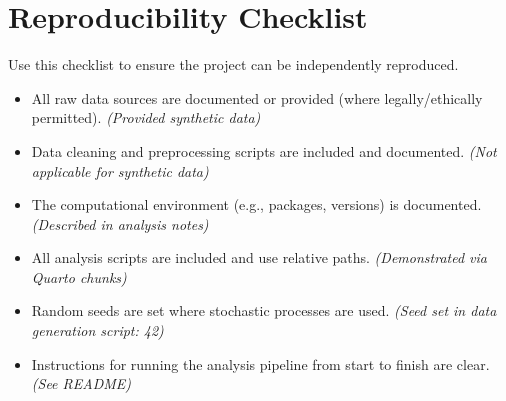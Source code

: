 \documentclass[
]{report}
\author{}
\date{}
\providecommand{\tightlist}{%
  \setlength{\itemsep}{0pt}\setlength{\parskip}{0pt}}
\renewcommand*\contentsname{Table of contents}
\newcommand\contentsname{Table of contents}
\begin{document}
\renewcommand*\contentsname{Table of contents}
{
\hypersetup{linkcolor=}
\setcounter{tocdepth}{2}
\tableofcontents
}

\chapter{Reproducibility Checklist}\label{reproducibility-checklist}

Use this checklist to ensure the project can be independently
reproduced.

\begin{itemize}
\tightlist
\item[$\boxtimes$]
  All raw data sources are documented or provided (where
  legally/ethically permitted). \emph{(Provided synthetic data)}
\item[$\boxtimes$]
  Data cleaning and preprocessing scripts are included and documented.
  \emph{(Not applicable for synthetic data)}
\item[$\boxtimes$]
  The computational environment (e.g., packages, versions) is
  documented. \emph{(Described in analysis notes)}
\item[$\boxtimes$]
  All analysis scripts are included and use relative paths.
  \emph{(Demonstrated via Quarto chunks)}
\item[$\boxtimes$]
  Random seeds are set where stochastic processes are used. \emph{(Seed
  set in data generation script: 42)}
\item[$\boxtimes$]
  Instructions for running the analysis pipeline from start to finish
  are clear. \emph{(See README)}
\end{itemize}
\end{document}
